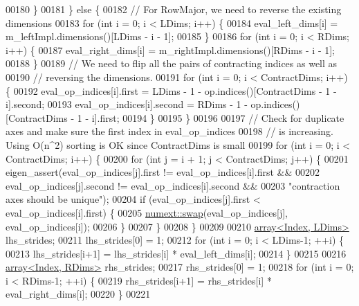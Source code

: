 \begin{DoxyCode}
00180       \}
00181     \} \textcolor{keywordflow}{else} \{
00182       \textcolor{comment}{// For RowMajor, we need to reverse the existing dimensions}
00183       \textcolor{keywordflow}{for} (\textcolor{keywordtype}{int} i = 0; i < LDims; i++) \{
00184         eval\_left\_dims[i] = m\_leftImpl.dimensions()[LDims - i - 1];
00185       \}
00186       \textcolor{keywordflow}{for} (\textcolor{keywordtype}{int} i = 0; i < RDims; i++) \{
00187         eval\_right\_dims[i] = m\_rightImpl.dimensions()[RDims - i - 1];
00188       \}
00189       \textcolor{comment}{// We need to flip all the pairs of contracting indices as well as}
00190       \textcolor{comment}{// reversing the dimensions.}
00191       \textcolor{keywordflow}{for} (\textcolor{keywordtype}{int} i = 0; i < ContractDims; i++) \{
00192         eval\_op\_indices[i].first = LDims - 1 - op.indices()[ContractDims - 1 - i].second;
00193         eval\_op\_indices[i].second = RDims - 1 - op.indices()[ContractDims - 1 - i].first;
00194       \}
00195     \}
00196 
00197     \textcolor{comment}{// Check for duplicate axes and make sure the first index in eval\_op\_indices}
00198     \textcolor{comment}{// is increasing. Using O(n^2) sorting is OK since ContractDims is small}
00199     \textcolor{keywordflow}{for} (\textcolor{keywordtype}{int} i = 0; i < ContractDims; i++) \{
00200       \textcolor{keywordflow}{for} (\textcolor{keywordtype}{int} j = i + 1; j < ContractDims; j++) \{
00201         eigen\_assert(eval\_op\_indices[j].first != eval\_op\_indices[i].first &&
00202                      eval\_op\_indices[j].second != eval\_op\_indices[i].second &&
00203                      \textcolor{stringliteral}{"contraction axes should be unique"});
00204         \textcolor{keywordflow}{if} (eval\_op\_indices[j].first < eval\_op\_indices[i].first) \{
00205           \hyperlink{endian_8c_a3ca5ecd34b04d6a243c054ac3a57f68d}{numext::swap}(eval\_op\_indices[j], eval\_op\_indices[i]);
00206         \}
00207       \}
00208     \}
00209 
00210     \hyperlink{class_eigen_1_1array}{array<Index, LDims>} lhs\_strides;
00211     lhs\_strides[0] = 1;
00212     \textcolor{keywordflow}{for} (\textcolor{keywordtype}{int} i = 0; i < LDims-1; ++i) \{
00213       lhs\_strides[i+1] = lhs\_strides[i] * eval\_left\_dims[i];
00214     \}
00215 
00216     \hyperlink{class_eigen_1_1array}{array<Index, RDims>} rhs\_strides;
00217     rhs\_strides[0] = 1;
00218     \textcolor{keywordflow}{for} (\textcolor{keywordtype}{int} i = 0; i < RDims-1; ++i) \{
00219       rhs\_strides[i+1] = rhs\_strides[i] * eval\_right\_dims[i];
00220     \}
00221 

\end{DoxyCode}
